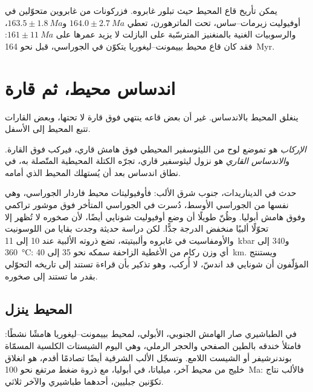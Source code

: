 يمكن تأريخ قاع المحيط حيث تبلور غابروه. فزركونات من غابروين متحوّلين في
أوفيوليت زيرمات--ساس، تحت الماترهورن، تعطي $164.0 \pm \qty{2.7}{Ma}$ و$163.5
\pm \qty{1.8}{Ma}$، والرسوبيات الغنية بالمنغنيز المترسّبة على البازلت لا يزيد عمرها على $161
\pm \qty{11}{Ma}$: فقد كان قاع محيط بييمونت--ليغوريا يتكوّن في الجوراسي،
قبل نحو \qty{164}{Myr}.

\section{اندساس محيط، ثم قارة}\label{sec:b2:alpine-orogen:subduction}

ينغلق المحيط بالاندساس. غير أن بعض قاعه ينتهي فوق قارة
لا تحتها، وبعض القارات تتبع المحيط إلى الأسفل.

\begin{definition}\label{def:b2:alpine-orogen:obduction}
\emph{الإركاب} هو تموضع لوح من الليثوسفير المحيطي فوق
هامش قاري، فيركب  فوق القارة. و\emph{الاندساس
القاري} هو نزول ليثوسفير قاري، تجرّه
الكتلة المحيطية المتّصلة به، في نطاق اندساس بعد أن يُستهلك المحيط الذي أمامه.
\end{definition}

حدث  في الديناريدات، جنوب شرق الألب: فأوفيوليتات محيط فاردار
الجوراسي، وهي نفسها من الجوراسي الأوسط، دُسرت في الجوراسي المتأخر فوق
موشور تراكمي وفوق هامش أبوليا. وظُنّ طويلًا أن  وضع
أوفيوليت شونايي أيضًا، لأن صخوره لا تُظهر إلا تحوّلًا ألبيًا منخفض الدرجة
جدًّا. لكن دراسة حديثة وجدت بقايا من اللوسونيت والأومفاسيت في غابروه
وألبيتيته، تضع ذروته الألبية عند 10 إلى \qty{11}{kbar} و340 إلى
\qty{360}{\celsius}: أي وزن ركام من الأغطية الزاحفة سمكه نحو 35 إلى \qty{40}{km}. ويستنتج المؤلّفون
أن شونايي قد اندسّ، لا أُركب، وهو تذكير بأن قراءة
 تستند إلى تاريخه التحوّلي بقدر ما تستند إلى صخوره.

\subsection*{المحيط ينزل}

في الطباشيري صار الهامش الجنوبي، الأبولي، لمحيط بييمونت--ليغوريا
هامشًا نشطًا: فامتلأ خندقه بالطين الصفحي والحجر الرملي، وهي اليوم الشيستات الكلسية
المسمّاة بوندنرشيفر أو الشيست اللامع. وتسجّل الألب الشرقية أيضًا تصادمًا
أقدم، هو انغلاق خليج من محيط آخر، ميلياتا، في أبوليا، مع
ذروة ضغط مرتفع نحو \qty{100}{Ma}: فالألب نتاج تكوّنين جبليين،
أحدهما طباشيري والآخر ثلاثي.

